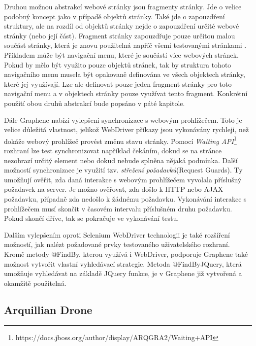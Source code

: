 \documentclass[
    color,   %
	table,   %
    twoside, %
]{fithesis3}
\begin{document}
Druhou možnou abstrakcí webové stránky jsou fragmenty stránky. Jde o velice podobný koncept jako v případě objektů stránky. Také jde o zapouzdření struktury, ale na rozdíl od objektů stránky nejde o zapouzdření určité webové stránky (nebo její část). Fragment stránky zapouzdřuje pouze určitou malou součást stránky, která je znovu použitelná napříč všemi testovanými stránkami \cite{Graphene}. Příkladem může být navigační menu, které je součástí více webových stránek. Pokud by mělo být využito pouze objektů stránek, tak by struktura tohoto navigačního menu musela být opakovaně definována ve všech objektech stránky, které jej využívají. Lze ale definovat pouze jeden fragment stránky pro toto navigační menu a v objektech stránky pouze využívat tento fragment. Konkrétní použití obou druhů abstrakcí bude popsáno v páté kapitole.

Dále Graphene nabízí vylepšení synchronizace s webovým prohlížečem. Toto je velice důležitá vlastnost, jelikož WebDriver příkazy jsou vykonávány rychleji, než dokáže webový prohlížeč provést změnu stavu stránky. Pomocí \emph{Waiting API}\footnote{https://docs.jboss.org/author/display/ARQGRA2/Waiting+API} rozhraní lze test synchronizovat například čekáním, dokud se na stránce nezobrazí určitý element nebo dokud nebude splněna nějaká podmínka. Další možností synchronizace je využití tzv. \emph{střežení požadavků}(Request Guards). Ty umožňují ověřit, zda daná interakce s webovým prohlížečem vyvolala příslušný požadavek na server. Je možno ověřovat, zda došlo k HTTP nebo AJAX požadavku, případně zda nedošlo k žádnému požadavku. Vykonávání interakce s prohlížečem musí skončit v časovém intervalu příslušném druhu požadavku. Pokud skončí dříve, tak se pokračuje ve vykonávání testu.

Dalším vylepšením oproti Selenium WebDriver technologii je také rozšíření možností, jak nalézt požadované prvky testovaného uživatelského rozhraní. Kromě metody @FindBy, kterou využívá i WebDriver, podporuje Graphene také možnost vytvořit vlastní vyhledávací strategie. Metoda @FindByJQuery, která umožňuje vyhledávat na základě JQuery funkce, je v Graphene již vytvořená a okamžitě použitelná.

\subsection{Arquillian Drone}
\end{document}

